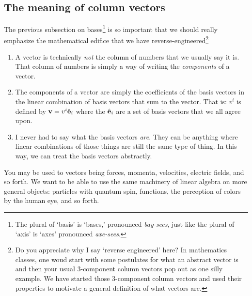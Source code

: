 \documentclass[12pt]{article}
\begin{document}
\subsection{The meaning of column vectors}

The previous subsection on bases\footnote{The plural of `basis' is `bases,' pronounced \emph{bay-sees}, just like the plural of `axis' is `axes' pronounced \emph{axe-sees}.} is so important that we should really emphasize the mathematical edifice that we have reverse-engineered\footnote{Do you appreciate why I say `reverse engineered' here? In mathematics classes, one woud start with some postulates for what an abstract vector is and then your usual 3-component column vectors pop out as one silly example. We have started those 3-component column vectors and used their properties to motivate a general definition of what vectors are.}
\begin{enumerate}
    \item A vector is technically \emph{not} the column of numbers that we usually say it is. That column of numbers is simply a way of writing the \emph{components} of a vector.
    \item The components of a vector are simply the coefficients of the basis vectors in the linear combination of basis vectors that sum to the vector. That is: $v^i$ is defined by $\mathbf{v} = v^i {\hat{\mathbf{e}}}_i$ where the ${\hat{\mathbf{e}}}_i$ are a set of basis vectors that we all agree upon.
    \item I never had to say what the basis vectors \emph{are}. They can be anything where linear combinations of those things are still the same type of thing. In this way, we can treat the basis vectors abstractly.
\end{enumerate}
You may be used to vectors being forces, momenta, velocities, electric fields, and so forth. We want to be able to use the same machinery of linear algebra on more general objects: particles with quantum spin, functions, the perception of colors by the human eye, and so forth.
\end{document}
